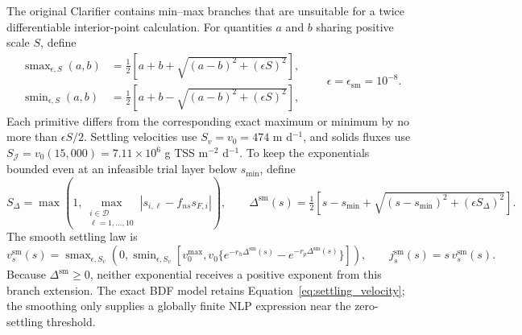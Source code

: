 \documentclass[a4paper,fleqn]{cas-sc}
\begin{document}
The original Clarifier contains min--max branches that are unsuitable for a twice differentiable interior-point calculation. For quantities $a$ and $b$ sharing positive scale $S$, define
\begin{equation}
\label{eq:smooth_minmax}
\begin{aligned}
\operatorname{smax}_{\epsilon,S}(a,b)
&=\tfrac12\!\left[a+b+\sqrt{(a-b)^2+(\epsilon S)^2}\right],\\
\operatorname{smin}_{\epsilon,S}(a,b)
&=\tfrac12\!\left[a+b-\sqrt{(a-b)^2+(\epsilon S)^2}\right],
\end{aligned}
\qquad \epsilon=\epsilon_{\mathrm{sm}}=10^{-8}.
\end{equation}
Each primitive differs from the corresponding exact maximum or minimum by no more than $\epsilon S/2$. Settling velocities use $S_v=v_0=474$ m d$^{-1}$, and solids fluxes use $S_{\mathcal J}=v_0(15{,}000)=7.11\times10^6$ g TSS m$^{-2}$ d$^{-1}$. To keep the exponentials bounded even at an infeasible trial layer below $s_{\min}$, define
\begin{equation}
S_\Delta=\max\!\left(1,\max_{\substack{i\in\mathcal D\\
\ell=1,\ldots,10}}|s_{i,\ell}-f_{ns}s_{F,i}|\right),
\qquad
\Delta^{\mathrm{sm}}(s)=\tfrac12\!\left[
s-s_{\min}+\sqrt{(s-s_{\min})^2+(\epsilon S_\Delta)^2}\right].
\end{equation}
The smooth settling law is
\begin{equation}
v_s^{\mathrm{sm}}(s)=
\operatorname{smax}_{\epsilon,S_v}\!\left(
0,\operatorname{smin}_{\epsilon,S_v}
\left[v_0^{\max},
v_0\{e^{-r_h\Delta^{\mathrm{sm}}(s)}
-e^{-r_p\Delta^{\mathrm{sm}}(s)}\}\right]\right),
\qquad j_s^{\mathrm{sm}}(s)=s\,v_s^{\mathrm{sm}}(s).
\end{equation}
Because $\Delta^{\mathrm{sm}}\geq0$, neither exponential receives a positive exponent from this branch extension. The exact BDF model retains Equation~\eqref{eq:settling_velocity}; the smoothing only supplies a globally finite NLP expression near the zero-settling threshold.
\end{document}
